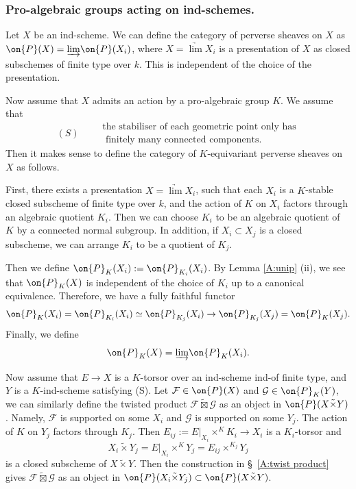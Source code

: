 \documentclass[]{pcmi}
\theoremstyle{plain}
\theoremstyle{remark}
\theoremstyle{definition}
\newcommand{\mF}{{\mathcal F}}
\newcommand{\mG}{{\mathcal G}}
\begin{document}
\subsubsection{Pro-algebraic groups acting on ind-schemes.}\label{A:ind}
Let $X$ be an ind-scheme. We can define the category of perverse sheaves on $X$ as $\on{P}(X)=\underrightarrow\lim\on{P}(X_i)$, where $X=\underrightarrow\lim X_i$ is a presentation of $X$ as closed subschemes of finite type over $k$. This is independent of the choice of the presentation.


Now assume that $X$ admits an action by a pro-algebraic group $K$. We assume that 
\[(S)\quad\quad \left.\begin{array}{c}\mbox{the stabiliser of each geometric point only has} \\ \mbox{ finitely many connected components.}\end{array}\right.\]
Then it makes sense to define the category of $K$-equivariant perverse sheaves on $X$ as follows.

First, there exists a presentation $X=\underrightarrow\lim X_i$, such that each $X_i$ is a $K$-stable closed subscheme of finite type over $k$, and the action of $K$ on $X_i$ factors through an algebraic quotient $K_i$. Then we can choose $K_i$ to be an algebraic quotient of $K$ by a connected normal subgroup. In addition, if $X_i\subset X_j$ is a closed subscheme, we can arrange $K_i$ to be a quotient of $K_j$.

Then we define $\on{P}_K(X_i):=\on{P}_{K_i}(X_i)$. By  Lemma \ref{A:unip} (ii), we see that $\on{P}_K(X)$ is independent of the choice of $K_i$ up to a canonical equivalence.  Therefore, we have a fully faithful functor
\[\on{P}_K(X_i)=\on{P}_{K_i}(X_i)\simeq \on{P}_{K_j}(X_i)\to \on{P}_{K_j}(X_j)=\on{P}_K(X_j).\]  
Finally, we define 
\[\on{P}_K(X)=\underrightarrow\lim \on{P}_K(X_i).\]

Now assume that $E\to X$ is a $K$-torsor over an ind-scheme ind-of finite type, and $Y$ is a $K$-ind-scheme satisfying (S). Let $\mF\in\on{P}(X)$ and $\mG\in\on{P}_K(Y)$, we can similarly define the twisted product $\mF\tilde\boxtimes\mG$ as an object in $\on{P}(X\tilde\times Y)$. Namely, $\mF$ is supported on some $X_i$ and $\mG$ is supported on some $Y_j$. The action of $K$ on $Y_j$ factors through $K_j$. Then $E_{ij}:=E|_{X_i}\times^KK_i\to X_i$ is a $K_i$-torsor and 
$$X_i\tilde\times Y_j= E|_{X_i}\times^KY_j= E_{ij}\times^{K_j}Y_j$$ 
is a closed subscheme of $X\tilde\times Y$. Then the construction in \S\ \ref{A:twist product} gives $\mF\tilde\boxtimes\mG$ as an object in $\on{P}(X_i\tilde\times Y_j)\subset \on{P}(X\tilde\times Y)$.  
\end{document}
